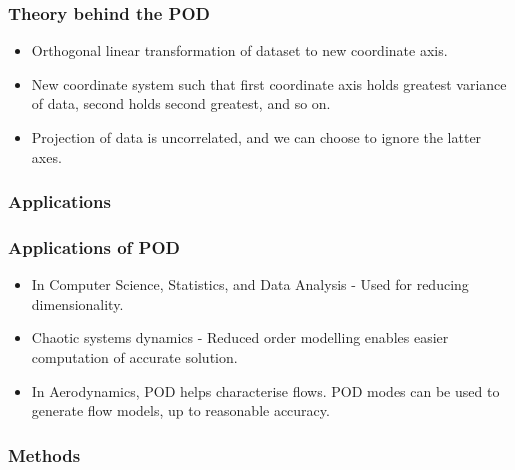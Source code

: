 \documentclass{beamer}
\begin{document}
\begin{frame}
\frametitle{Theory behind the POD}

\begin{itemize}
\item
Orthogonal linear transformation of dataset to new coordinate axis.
\item
New coordinate system such that first coordinate axis holds greatest variance of data, second holds second greatest, and so on.
\item
Projection of data is uncorrelated, and we can choose to ignore the latter axes. 
\end{itemize}

\end{frame}

\subsubsection{Applications}

\begin{frame}
\frametitle{Applications of POD}

\begin{itemize}
\item
In Computer Science, Statistics, and Data Analysis - Used for reducing dimensionality.
\item
Chaotic systems dynamics - Reduced order modelling enables easier computation of accurate solution.
\item
In Aerodynamics, POD helps characterise flows. POD modes can be used to generate flow models, up to reasonable accuracy.
\end{itemize}
\end{frame}


\subsubsection{Methods}
\end{document}
